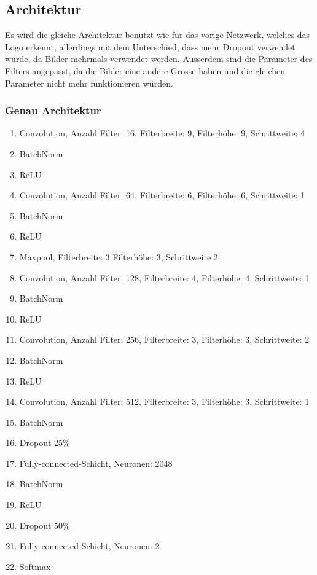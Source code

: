 \documentclass[12pt,a4paper]{report}
\begin{document}
\subsection{Architektur}
Es wird die gleiche Architektur benutzt wie für das vorige Netzwerk, welches das Logo erkennt, allerdings mit dem Unterschied,
dass mehr Dropout verwendet wurde, da Bilder mehrmals verwendet werden.
Ausserdem sind die Parameter des Filters angepasst, da die Bilder eine andere Grösse haben und die gleichen Parameter nicht mehr funktionieren würden.
\subsubsection{Genau Architektur}

\begin{enumerate}
    \setlength\itemsep{0cm}
    \setlength{\parskip}{0pt}
    \setlength{\parsep}{0pt}
    \item Convolution, Anzahl Filter: 16, Filterbreite: 9, Filterhöhe: 9, Schrittweite: 4
    \item BatchNorm
    \item ReLU
    \item Convolution, Anzahl Filter: 64, Filterbreite: 6, Filterhöhe: 6, Schrittweite: 1
    \item BatchNorm
    \item ReLU
    \item Maxpool, Filterbreite: 3 Filterhöhe: 3, Schrittweite 2
    \item Convolution, Anzahl Filter: 128, Filterbreite: 4, Filterhöhe: 4, Schrittweite: 1
    \item BatchNorm
    \item ReLU
    \item Convolution, Anzahl Filter: 256, Filterbreite: 3, Filterhöhe: 3, Schrittweite: 2
    \item BatchNorm
    \item ReLU
    \item Convolution, Anzahl Filter: 512, Filterbreite: 3, Filterhöhe: 3, Schrittweite: 1
    \item BatchNorm
    \item Dropout 25\%
    \item Fully-connected-Schicht, Neuronen: 2048
    \item BatchNorm
    \item ReLU
    \item Dropout 50\%
    \item Fully-connected-Schicht, Neuronen: 2
    \item Softmax
\end{enumerate}
\end{document}

